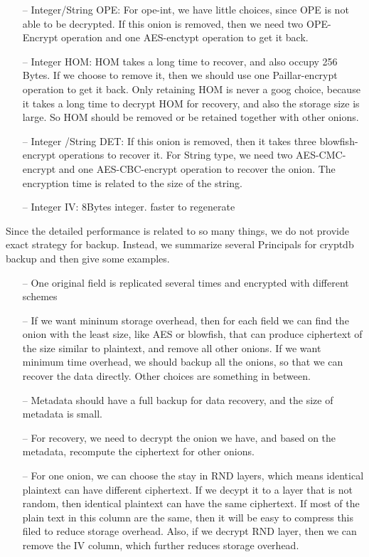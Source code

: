 \begin{itemize}
\item[--] Integer/String OPE: For ope-int, we have little choices, since OPE is not able to be decrypted. If this onion is removed, then we need two OPE-Encrypt operation and one AES-enctypt operation to get it back. 
\item[--] Integer HOM: HOM takes a long time to recover, and also occupy 256 Bytes. If we choose to remove it, then we should use one Paillar-encrypt operation to get it back. Only retaining HOM is never a goog choice, because it takes a long time to decrypt HOM for recovery, and also the storage size is large. So HOM should be removed or be retained together with other onions.
\item[--] Integer /String DET: If this onion is removed, then it takes three blowfish-encrypt operations to recover it. For String type, we need two AES-CMC-encrypt and one AES-CBC-encrypt operation to recover the onion. The encryption time is related to the size of the string.
\item[--] Integer IV: 8Bytes integer. faster to regenerate
\end{itemize}



Since the detailed performance is related to so many things, we do not provide exact strategy for backup. Instead, we summarize several Principals for cryptdb backup and then give some examples. 

\begin{itemize}
\item[--] One original field is replicated several times and encrypted with different schemes
\item[--] If we want mininum storage overhead, then for each field we can find the onion with the least size, like AES or blowfish, that can produce ciphertext of the size similar to plaintext, and remove all other onions. If we want minimum time overhead, we should backup all the onions, so that we can recover the data directly. Other choices are something in between.
\item[--] Metadata should have a full backup for data recovery, and the size of metadata is small. 
\item[--] For recovery, we need to decrypt the onion we have, and based on the metadata, recompute the ciphertext for other onions.
\item[--] For one onion, we can choose the stay in RND layers, which means identical plaintext can have different ciphertext. If we decypt it to a layer that is not random, then identical plaintext can have the same ciphertext. If most of the plain text in this column are the same, then it will be easy to compress this filed to reduce storage overhead. Also, if we decrypt RND layer, then we can remove the IV column, which further reduces storage overhead.
\end{itemize}


